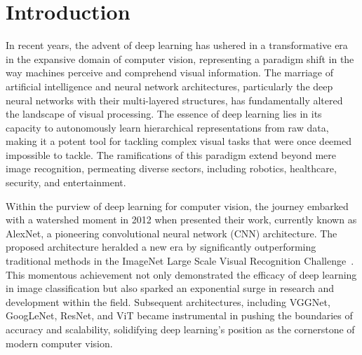 \chapter{Introduction}

In recent years, the advent of deep learning has ushered in a transformative era in the expansive domain of computer vision, representing a paradigm shift in the way machines perceive and comprehend visual information. The marriage of artificial intelligence and neural network architectures, particularly the deep neural networks with their multi-layered structures, has fundamentally altered the landscape of visual processing. The essence of deep learning lies in its capacity to autonomously learn hierarchical representations from raw data, making it a potent tool for tackling complex visual tasks that were once deemed impossible to tackle. The ramifications of this paradigm extend beyond mere image recognition, permeating diverse sectors, including robotics, healthcare, security, and entertainment.

Within the purview of deep learning for computer vision, the journey embarked with a watershed moment in 2012 when \cite{krizhevsky2012imagenet} presented their work, currently known as AlexNet, a pioneering convolutional neural network (CNN) architecture. The proposed architecture heralded a new era by significantly outperforming traditional methods in the ImageNet Large Scale Visual Recognition Challenge~\citep{ILSVRC15}. This momentous achievement not only demonstrated the efficacy of deep learning in image classification but also sparked an exponential surge in research and development within the field. Subsequent architectures, including VGGNet, GoogLeNet, ResNet, and ViT became instrumental in pushing the boundaries of accuracy and scalability, solidifying deep learning's position as the cornerstone of modern computer vision.